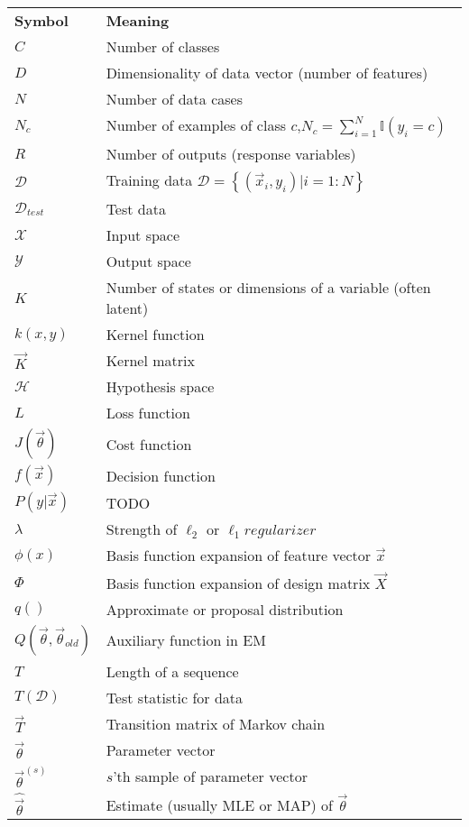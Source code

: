 \begin{longtable}{ll}
\hline\noalign{\smallskip}
\textbf{Symbol} & \textbf{Meaning} \\
\noalign{\smallskip}\hline\noalign{\smallskip}
$C$ & Number of classes\\
$D$ & Dimensionality of data vector (number of features)\\
$N$ & Number of data cases\\
$N_c$ & Number of examples of class $c$,$N_c=\sum_{i=1}^{N}\mathbb{I}(y_i=c)$\\
$R$ & Number of outputs (response variables)\\
$\mathcal{D}$ & Training data $\mathcal{D}=\left\{(\vec{x}_i,y_i) | i=1:N\right\}$\\
$\mathcal{D}_{test}$ & Test data\\
$\mathcal{X}$ & Input space\\
$\mathcal{Y}$ & Output space\\
$K$ & Number of states or dimensions of a variable (often latent)\\
$k(x,y)$ & Kernel function\\
$\vec{K}$ & Kernel matrix\\
$\mathcal{H}$ & Hypothesis space\\
$L$ & Loss function \\
$J(\vec{\theta})$ & Cost function\\
$f(\vec{x})$ & Decision function\\
$P(y|\vec{x})$ & TODO\\
$\lambda$ & Strength of $\ell_2$ or $\ell_1 regularizer$\\
$\phi(x)$ & Basis function expansion of feature vector $\vec{x}$\\
$\Phi$ & Basis function expansion of design matrix $\vec{X}$\\
$q()$ & Approximate or proposal distribution\\
$Q(\vec{\theta},\vec{\theta}_{old})$ & Auxiliary function in EM\\
$T$ & Length of a sequence\\
$T(\mathcal{D})$ & Test statistic for data\\
$\vec{T}$ & Transition matrix of Markov chain\\
$\vec{\theta}$ & Parameter vector\\
$\vec{\theta}^{(s)}$ & $s$'th sample of parameter vector\\
$\hat{\vec{\theta}}$ & Estimate (usually MLE or MAP) of $\vec{\theta}$\\

\end{longtable}

